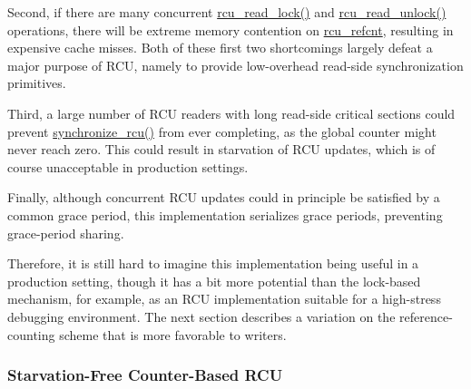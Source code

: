 Second, if there are many concurrent \url{rcu_read_lock()}
and \url{rcu_read_unlock()} operations, there will
be extreme memory contention on \url{rcu_refcnt},
resulting in expensive cache misses.
Both of these first two shortcomings largely defeat a major purpose of
RCU, namely to provide low-overhead read-side synchronization primitives.

Third, a large number of RCU readers with long read-side
critical sections could prevent \url{synchronize_rcu()}
from ever completing, as the global counter might
never reach zero.
This could result in starvation of RCU updates, which
is of course unacceptable in production settings.

Finally, although concurrent RCU updates could in principle be
satisfied by a common grace period, this implementation
serializes grace periods, preventing grace-period
sharing.

 \QuickQuizEnd

Therefore, it is still hard to imagine this implementation being useful
in a production setting, though it has a bit more potential
than the lock-based mechanism, for example, as an RCU implementation
suitable for a high-stress debugging environment.
The next section describes a variation on the reference-counting
scheme that is more favorable to writers.

\subsubsection{Starvation-Free Counter-Based RCU}
\label{defer:Starvation-Free Counter-Based RCU}

